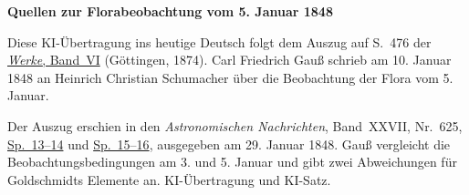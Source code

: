 \clearpage\thispagestyle{empty}
\begin{center}\textbf{Quellen zur Florabeobachtung vom 5. Januar 1848}\end{center}
\noindent Diese KI-Übertragung ins heutige Deutsch folgt dem Auszug auf S.~476 der \href{https://gdz.sub.uni-goettingen.de/id/PPN236007467}{\textit{Werke}, Band~VI} (Göttingen, 1874). Carl Friedrich Gauß schrieb am 10. Januar 1848 an Heinrich Christian Schumacher über die Beobachtung der Flora vom 5. Januar.
\par\smallskip\noindent Der Auszug erschien in den \textit{Astronomischen Nachrichten}, Band~XXVII, Nr.~625, \href{https://api.digitale-sammlungen.de/iiif/image/v2/bsb10049452_00015/full/1800,/0/default.jpg}{Sp.~13--14} und \href{https://api.digitale-sammlungen.de/iiif/image/v2/bsb10049452_00016/full/1800,/0/default.jpg}{Sp.~15--16}, ausgegeben am 29. Januar 1848. Gauß vergleicht die Beobachtungsbedingungen am 3. und 5. Januar und gibt zwei Abweichungen für Goldschmidts Elemente an. KI-Übertragung und KI-Satz.
\clearpage
